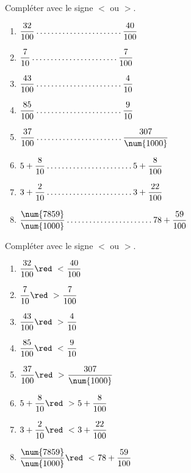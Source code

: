 \begin{exercice} %
    Compléter avec le signe $<$ ou $>$. \medskip
    \begin{multicols}{2}
        \begin{spacing}{2}
            \begin{enumerate}
                \item $\dfrac{32}{100}                  \makebox[0.3\linewidth]{\dotfill} \dfrac{40}{100}$ 
                \item $\dfrac{7}{10}                    \makebox[0.3\linewidth]{\dotfill} \dfrac{7}{100}$ 
                \item $\dfrac{43}{100}                  \makebox[0.3\linewidth]{\dotfill} \dfrac{4}{10}$ 
                \item $\dfrac{85}{100}                  \makebox[0.3\linewidth]{\dotfill} \dfrac{9}{10}$
                \item $\dfrac{37}{100}                  \makebox[0.3\linewidth]{\dotfill} \dfrac{307}{\num{1000}}$
                \item $5+\dfrac{8}{10}                  \makebox[0.3\linewidth]{\dotfill} 5+\dfrac{8}{100}$
                \item $3+\dfrac{2}{10}                  \makebox[0.3\linewidth]{\dotfill} 3+\dfrac{22}{100}$
                \item $\dfrac{\num{7859}}{\num{1000}}   \makebox[0.3\linewidth]{\dotfill} 78+\dfrac{59}{100}$
            \end{enumerate}
        \end{spacing}
    \end{multicols}
 \end{exercice}
 
 \begin{corrige}
    Compléter avec le signe $<$ ou $>$. \medskip

    \begin{multicols}{2}
        \begin{spacing}{1.5}
            \begin{enumerate}
                \item $\dfrac{32}{100}                  {\red~<~} \dfrac{40}{100}$ 
                \item $\dfrac{7}{10}                    {\red~>~} \dfrac{7}{100}$ 
                \item $\dfrac{43}{100}                  {\red~>~} \dfrac{4}{10}$ 
                \item $\dfrac{85}{100}                  {\red~<~} \dfrac{9}{10}$
                \item $\dfrac{37}{100}                  {\red~>~} \dfrac{307}{\num{1000}}$
                \item $5+\dfrac{8}{10}                  {\red~>~} 5+\dfrac{8}{100}$
                \item $3+\dfrac{2}{10}                  {\red~<~} 3+\dfrac{22}{100}$
                \item $\dfrac{\num{7859}}{\num{1000}}   {\red~<~} 78+\dfrac{59}{100}$
            \end{enumerate}
        \end{spacing}
    \end{multicols}
\end{corrige}